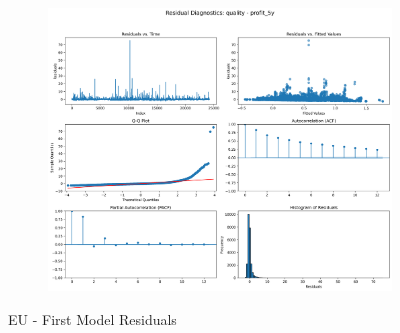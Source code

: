 \documentclass[11pt,english,a4paper,hidelinks]{book}
\begin{document}
\begin{figure}[H]
\begin{subfigure}[b]{0.32\textwidth}
    \end{subfigure}
    \hfill
    \begin{subfigure}[b]{0.32\textwidth}
        \centering
        \includegraphics[width=\textwidth]{images/code/models/linear_regression/first_model/EU/quality_profit_5y_residuals.png}
    \end{subfigure}
    \caption{EU - First Model Residuals}
    \label{fig:linear_regression_EU_residues}
\end{figure}
\end{document}
